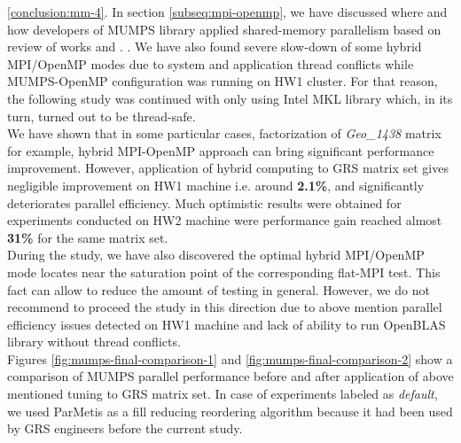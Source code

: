 \ref{conclusion:mm-4}. In section \ref{subseq:mpi-openmp}, we have discussed where and how developers of MUMPS library applied shared-memory parallelism based on review of works \cite{chowdhury2010some} and \cite{l2013introduction}.  . We have also found severe slow-down of some hybrid MPI/OpenMP modes due to system and application thread conflicts  while MUMPS-OpenMP configuration was running on HW1 cluster. For that reason, the following study was continued with only using Intel MKL library which, in its turn, turned out to be thread-safe.\\


We have shown that in some particular cases, factorization of \textit{Geo\_1438} matrix for example, hybrid MPI-OpenMP approach can bring significant performance improvement. However, application of hybrid computing to GRS matrix set gives negligible improvement on HW1 machine i.e. around \textbf{2.1\%}, and significantly deteriorates parallel efficiency. Much optimistic results were obtained for experiments conducted on HW2 machine were performance gain reached almost \textbf{31\%} for the same matrix set. \\


During the study, we have also discovered the optimal hybrid MPI/OpenMP mode locates near the saturation point of the corresponding flat-MPI test. This fact can allow to reduce the amount of testing in general. However, we do not recommend to proceed the study in this direction due to above mention parallel efficiency issues detected on HW1 machine and lack of ability to run OpenBLAS library without thread conflicts.\\


Figures \ref{fig:mumps-final-comparison-1} and \ref{fig:mumps-final-comparison-2} show a comparison of MUMPS parallel performance before and after application of above mentioned tuning to GRS matrix set. In case of experiments labeled as \textit{default}, we used ParMetis as a fill reducing reordering algorithm because it had been used by GRS engineers before the current study.\\


